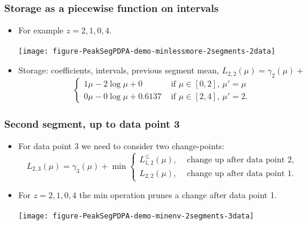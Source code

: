 \documentclass{beamer}
\begin{document}
\begin{frame}
  \frametitle{Storage as a piecewise function on intervals}
  \begin{itemize}
  \item For example $z = 2, 1, 0, 4$.
    \begin{center}
      \texttt{[image: figure-PeakSegPDPA-demo-minlessmore-2segments-2data]}
    \end{center}
  \item Storage: coefficients, intervals, previous segment mean,
    $L_{2,2}(\mu) = \gamma_2(\mu) +$
    \begin{equation*}
      \begin{cases}
        1\mu - 2\log \mu + 0 & \text{ if } \mu\in[0, 2],\, \mu'=\mu\\
        0\mu -0\log\mu + 0.6137 & \text{ if } \mu\in[2, 4],\, \mu'=2.
      \end{cases}
    \end{equation*}
  \end{itemize}
\end{frame}

 
\begin{frame}[fragile]
  \frametitle{Second segment, up to data point 3}
  \begin{itemize}
  \item For data point 3 we need to consider two change-points:
    \begin{equation*}
      L_{2,3}(\mu) =  \gamma_3(\mu) + \min
      \begin{cases}
        L_{1,2}^{\leq}(\mu), & \text{ change up after data point 2},\\
        L_{2,2}(\mu), & \text{ change up after data point 1}. 
      \end{cases}
    \end{equation*}
  \item For $z = 2, 1, 0, 4$ the min operation prunes a
    change after data point 1.
    \begin{center}
      \texttt{[image: figure-PeakSegPDPA-demo-minenv-2segments-3data]}
    \end{center}
  \end{itemize}
\end{frame}
\end{document}
